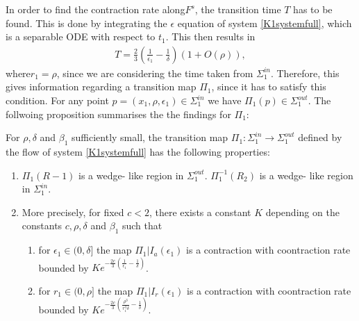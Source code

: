 In order to find the contraction rate along$F^s$, the transition time $T$ has to be found. This is done by integrating the $\epsilon$ equation of system \ref{K1systemfull}, which is a separable ODE with respect to $t_1$.
This then results in 
\begin{align*}
T= \frac{2}{3} \left(\frac{1}{\epsilon_1} - \frac{1}{\delta} \right) \left( 1 + O(\rho) \right),
\end{align*}
where$r_1= \rho$, since we are considering the time taken from $\Sigma^{in}_1$. 
Therefore, this gives information regarding a transition map $\Pi_1$, since it has to satisfy this condition. For any point $p= (x_1, \rho, \epsilon_1) \in \Sigma^{in}_1$ we have $ \Pi_1(p) \in \Sigma^{out}_1$.
The follwoing proposition summarises the the findings for $\Pi_1$:
\begin{prop}
For $\rho, \delta$ and $\beta_1$ sufficiently small, the transition map $\Pi_1: \Sigma^{in}_1 \to \Sigma^{out}_1$ defined by the flow of system \ref{K1systemfull} has the following properties:
\begin{enumerate}
\item $\Pi_1(R-1)$ is a wedge- like region in $\Sigma^{out}_1$. $\Pi_1^{-1}(R_2)$  is a wedge- like region in $\Sigma^{in}_1$.
\item More precisely, for fixed $c<2$, there exists a constant $K$ depending on the constants $c, \rho, \delta$ and $\beta_1$ such that
\begin{enumerate}
\item for $\epsilon_1 \in (0, \delta] $ the map $\Pi_1 |I_a(\epsilon_1)$ is a contraction with coontraction rate bounded by $Ke^{-\frac{2c}{3} \left(\frac{1}{\epsilon_1} - \frac{1}{\delta} \right)}$.
\item for $r_1 \in (0, \rho] $ the map $\Pi_1 |I_r(\epsilon_1)$ is a contraction with coontraction rate bounded by $Ke^{-\frac{2c}{3} \left(\frac{\rho^3}{r_1^3 \delta} - \frac{1}{\delta} \right)}$.
\end{enumerate}
\end{enumerate}
\end{prop}












































